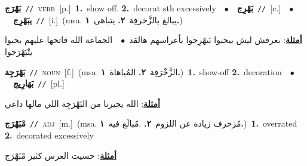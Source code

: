 \documentclass[10pt,a4paper,twoside]{article} %
\begin{document}
\begin{multicols}{2}
{\setlength\topsep{0pt}\textbf{\foreignlanguage{arabic}{بَهْرَج}}\ {\color{gray}\texttt{//}\color{black}}\ \textsc{verb}\ [p.]\ \textbf{1.}~show off.  \textbf{2.}~decorat sth excessively\ \ $\bullet$\ \ \setlength\topsep{0pt}\textbf{\foreignlanguage{arabic}{بَهْرِج}}\ {\color{gray}\texttt{//}\color{black}}\ [c.]\ \ $\bullet$\ \ \setlength\topsep{0pt}\textbf{\foreignlanguage{arabic}{يبَهْرِج}}\ {\color{gray}\texttt{//}\color{black}}\ [i.]\ \color{gray}(msa. \foreignlanguage{arabic}{يبالغ بالزَّخرفِة}~\foreignlanguage{arabic}{\textbf{٢.}}  \foreignlanguage{arabic}{يتباهى}~\foreignlanguage{arabic}{\textbf{١.}})\color{black}\  \begin{flushright}\color{gray}\foreignlanguage{arabic}{\textbf{\underline{\foreignlanguage{arabic}{أمثلة}}}: بعرفش ليش بيحبوا بَيهْرِجوا بأعراسهم هالقد\ $\bullet$\ \  الجماعة الله فاتحها عليهم بحبوا يتْبَهْرَجوا}\end{flushright}\color{black}} \vspace{2mm}

{\setlength\topsep{0pt}\textbf{\foreignlanguage{arabic}{بَهْرَجِة}}\ {\color{gray}\texttt{//}\color{black}}\ \textsc{noun}\ [f.]\ \color{gray}(msa. \foreignlanguage{arabic}{الزَّخْرَفِة}~\foreignlanguage{arabic}{\textbf{٢.}}  \foreignlanguage{arabic}{المُباهاة}~\foreignlanguage{arabic}{\textbf{١.}})\color{black}\ \textbf{1.}~show-off  \textbf{2.}~decoration\ \ $\bullet$\ \ \setlength\topsep{0pt}\textbf{\foreignlanguage{arabic}{بَهَارِيج}}\ {\color{gray}\texttt{//}\color{black}}\ [pl.]\  \begin{flushright}\color{gray}\foreignlanguage{arabic}{\textbf{\underline{\foreignlanguage{arabic}{أمثلة}}}: الله يجيرنا من البَهْرَجِة اللي مالها داعي}\end{flushright}\color{black}} \vspace{2mm}

{\setlength\topsep{0pt}\textbf{\foreignlanguage{arabic}{مْبَهْرَج}}\ {\color{gray}\texttt{//}\color{black}}\ \textsc{adj}\ [m.]\ \color{gray}(msa. \foreignlanguage{arabic}{مُزخرف زيادة عن اللزوم}~\foreignlanguage{arabic}{\textbf{٢.}}  .\foreignlanguage{arabic}{مُبالَغ فيه}~\foreignlanguage{arabic}{\textbf{١.}})\color{black}\ \textbf{1.}~overrated  \textbf{2.}~decorated excessively\  \begin{flushright}\color{gray}\foreignlanguage{arabic}{\textbf{\underline{\foreignlanguage{arabic}{أمثلة}}}: حسيت العرس كثير مْبَهْرَج}\end{flushright}\color{black}} \vspace{2mm}


\end{multicols}
\end{document}
